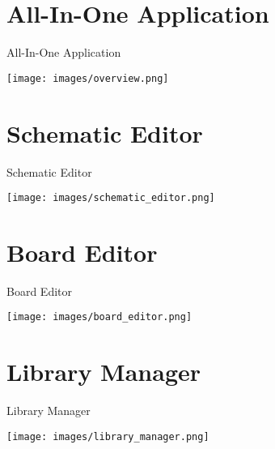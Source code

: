 \documentclass[aspectratio=1610,t]{beamer}
\begin{document}

\section{All-In-One Application}

\begin{frame}{All-In-One Application}
	\begin{center}
		\texttt{[image: images/overview.png]}
	\end{center}
\end{frame}


\section{Schematic Editor}

\begin{frame}{Schematic Editor}
	\begin{center}
		\texttt{[image: images/schematic\_editor.png]}
	\end{center}
\end{frame}


\section{Board Editor}

\begin{frame}{Board Editor}
	\begin{center}
		\texttt{[image: images/board\_editor.png]}
	\end{center}
\end{frame}


\section{Library Manager}

\begin{frame}{Library Manager}
	\begin{center}
		\texttt{[image: images/library\_manager.png]}
	\end{center}
\end{frame}
\end{document}

